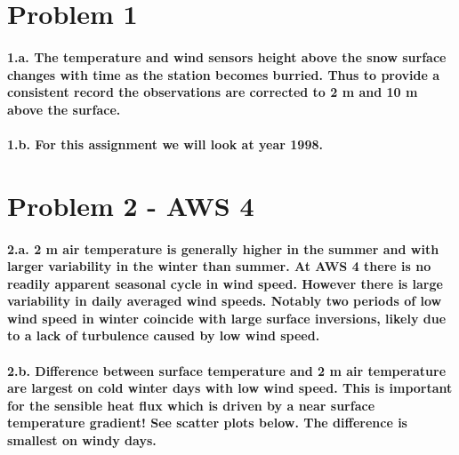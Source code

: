 \documentclass[11pt]{article}
\begin{document}
    \section{Problem 1}\label{problem-1}

\paragraph{1.a. The temperature and wind sensors height above the snow
surface changes with time as the station becomes burried. Thus to
provide a consistent record the observations are corrected to 2 m and 10
m above the
surface.}\label{a.-the-temperature-and-wind-sensors-height-above-the-snow-surface-changes-with-time-as-the-station-becomes-burried.-thus-to-provide-a-consistent-record-the-observations-are-corrected-to-2-m-and-10-m-above-the-surface.}

\paragraph{1.b. For this assignment we will look at year
1998.}\label{b.-for-this-assignment-we-will-look-at-year-1998.}

    \section{Problem 2 - AWS 4}\label{problem-2---aws-4}

\paragraph{2.a. 2 m air temperature is generally higher in the summer
and with larger variability in the winter than summer. At AWS 4 there is
no readily apparent seasonal cycle in wind speed. However there is large
variability in daily averaged wind speeds. Notably two periods of low
wind speed in winter coincide with large surface inversions, likely due
to a lack of turbulence caused by low wind
speed.}\label{a.-2-m-air-temperature-is-generally-higher-in-the-summer-and-with-larger-variability-in-the-winter-than-summer.-at-aws-4-there-is-no-readily-apparent-seasonal-cycle-in-wind-speed.-however-there-is-large-variability-in-daily-averaged-wind-speeds.-notably-two-periods-of-low-wind-speed-in-winter-coincide-with-large-surface-inversions-likely-due-to-a-lack-of-turbulence-caused-by-low-wind-speed.}

\paragraph{2.b. Difference between surface temperature and 2 m air
temperature are largest on cold winter days with low wind speed. This is
important for the sensible heat flux which is driven by a near surface
temperature gradient! See scatter plots below. The difference is
smallest on windy
days.}\label{b.-difference-between-surface-temperature-and-2-m-air-temperature-are-largest-on-cold-winter-days-with-low-wind-speed.-this-is-important-for-the-sensible-heat-flux-which-is-driven-by-a-near-surface-temperature-gradient-see-scatter-plots-below.-the-difference-is-smallest-on-windy-days.}
\end{document}
